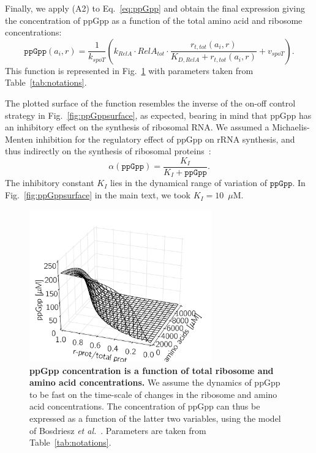 Finally, we apply (A2) to Eq.~\ref{eq:ppGpp} and obtain the final expression giving the concentration of ppGpp as a function of the total amino acid and ribosome concentrations:
\begin{equation}
\texttt{ppGpp}(a_i, r) = \frac{1}{k_{spoT}} \left( k_{RelA} \cdot RelA_{tot} \cdot \frac{r_{t,tot}(a_i, r)}{K_{D,RelA} + r_{t,tot}(a_i,r)} + v_{spoT} \right).
\end{equation}
This function is represented in Fig.~\ref{fig:ppGpp} with parameters taken from Table~\ref{tab:notations}.

The plotted surface of the function resembles the inverse of the on-off control strategy in Fig.~\ref{fig:ppGppsurface}, as expected, bearing in mind that ppGpp has an inhibitory effect on the synthesis of ribosomal RNA.
We assumed a Michaelis-Menten inhibition for the regulatory effect of ppGpp on rRNA synthesis, and thus indirectly on the synthesis of ribosomal proteins~\cite{potrykus_pppgpp_2008,keener_regulation_1996}:
\begin{equation}
\alpha (\texttt{ppGpp}) = \frac{K_I}{K_I + \texttt{ppGpp}}.
\end{equation}
The inhibitory constant $K_I$ lies in the dynamical range of variation of $\texttt{ppGpp}$.
In Fig.~\ref{fig:ppGppsurface} in the main text, we took $K_I = 10$~$\mu$M.

\begin{figure}[p]
\centering
\includegraphics[width=0.7\textwidth]{./Fig/FigS4-1}
\caption{
\textbf{ppGpp concentration is a function of total ribosome and amino acid concentrations.}
We assume the dynamics of ppGpp to be fast on the time-scale of changes in the ribosome and amino acid concentrations.
The concentration of ppGpp can thus be expressed as a function of the latter two variables, using the model of Bosdriesz \textit{et al.}~\cite{bosdriesz_how_2015}.
Parameters are taken from Table~\ref{tab:notations}.
}
\label{fig:ppGpp}
\end{figure}

